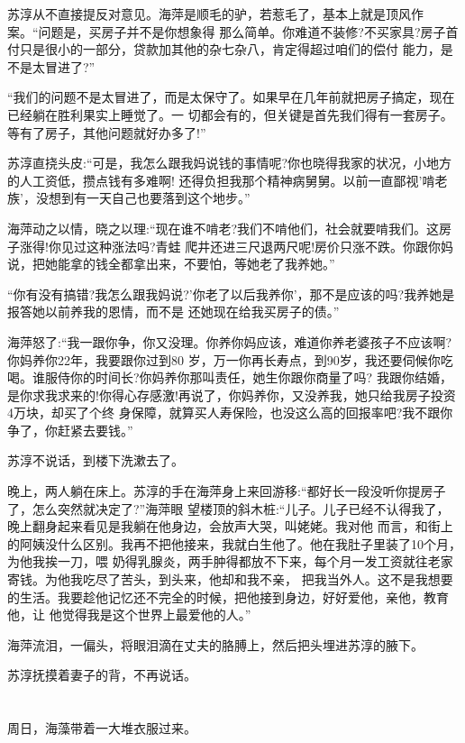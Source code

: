 \documentclass[11pt,a4paper,onecolumn]{article}
\begin{document}
苏淳从不直接提反对意见。海萍是顺毛的驴，若惹毛了，基本上就是顶风作案。``问题是，买房子并不是你想象得
那么简单。你难道不装修?不买家具?房子首付只是很小的一部分，贷款加其他的杂七杂八，肯定得超过咱们的偿付
能力，是不是太冒进了?''

``我们的问题不是太冒进了，而是太保守了。如果早在几年前就把房子搞定，现在已经躺在胜利果实上睡觉了。一
切都会有的，但关键是首先我们得有一套房子。等有了房子，其他问题就好办多了!''

苏淳直挠头皮:``可是，我怎么跟我妈说钱的事情呢?你也晓得我家的状况，小地方的人工资低，攒点钱有多难啊!
还得负担我那个精神病舅舅。以前一直鄙视'啃老族'，没想到有一天自己也要落到这个地步。''

海萍动之以情，晓之以理:``现在谁不啃老?我们不啃他们，社会就要啃我们。这房子涨得!你见过这种涨法吗?青蛙
爬井还进三尺退两尺呢!房价只涨不跌。你跟你妈说，把她能拿的钱全都拿出来，不要怕，等她老了我养她。''

``你有没有搞错?我怎么跟我妈说?'你老了以后我养你'，那不是应该的吗?我养她是报答她以前养我的恩情，而不是
还她现在给我买房子的债。''

海萍怒了:``我一跟你争，你又没理。你养你妈应该，难道你养老婆孩子不应该啊?你妈养你22年，我要跟你过到80
岁，万一你再长寿点，到90岁，我还要伺候你吃喝。谁服侍你的时间长?你妈养你那叫责任，她生你跟你商量了吗?
我跟你结婚，是你求我求来的!你得心存感激!再说了，你妈养你，又没养我，她只给我房子投资4万块，却买了个终
身保障，就算买人寿保险，也没这么高的回报率吧?我不跟你争了，你赶紧去要钱。''

苏淳不说话，到楼下洗漱去了。

晚上，两人躺在床上。苏淳的手在海萍身上来回游移:``都好长一段没听你提房子了，怎么突然就决定了?''海萍眼
望楼顶的斜木桩:``儿子。儿子已经不认得我了，晚上翻身起来看见是我躺在他身边，会放声大哭，叫姥姥。我对他
而言，和街上的阿姨没什么区别。我再不把他接来，我就白生他了。他在我肚子里装了10个月，为他我挨一刀，喂
奶得乳腺炎，两手肿得都放不下来，每个月一发工资就往老家寄钱。为他我吃尽了苦头，到头来，他却和我不亲，
把我当外人。这不是我想要的生活。我要趁他记忆还不完全的时候，把他接到身边，好好爱他，亲他，教育他，让
他觉得我是这个世界上最爱他的人。''

海萍流泪，一偏头，将眼泪滴在丈夫的胳膊上，然后把头埋进苏淳的腋下。

苏淳抚摸着妻子的背，不再说话。

\section[\thesection]{}

周日，海藻带着一大堆衣服过来。
\end{document}
